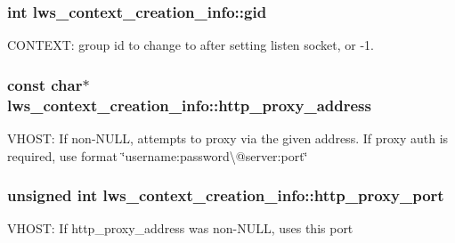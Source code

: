 \subsubsection[{\texorpdfstring{gid}{gid}}]{\setlength{\rightskip}{0pt plus 5cm}int lws\+\_\+context\+\_\+creation\+\_\+info\+::gid}\hypertarget{structlws__context__creation__info_a9c9d22437de92c197f3cee52912b2c03}{}\label{structlws__context__creation__info_a9c9d22437de92c197f3cee52912b2c03}
C\+O\+N\+T\+E\+XT\+: group id to change to after setting listen socket, or -\/1. 
\subsubsection[{\texorpdfstring{http\+\_\+proxy\+\_\+address}{http\_proxy\_address}}]{\setlength{\rightskip}{0pt plus 5cm}const char$\ast$ lws\+\_\+context\+\_\+creation\+\_\+info\+::http\+\_\+proxy\+\_\+address}\hypertarget{structlws__context__creation__info_aef917c0b23976a264d2474901b4f5aa3}{}\label{structlws__context__creation__info_aef917c0b23976a264d2474901b4f5aa3}
V\+H\+O\+ST\+: If non-\/\+N\+U\+LL, attempts to proxy via the given address. If proxy auth is required, use format \char`\"{}username\+:password\textbackslash{}@server\+:port\char`\"{} 
\subsubsection[{\texorpdfstring{http\+\_\+proxy\+\_\+port}{http\_proxy\_port}}]{\setlength{\rightskip}{0pt plus 5cm}unsigned int lws\+\_\+context\+\_\+creation\+\_\+info\+::http\+\_\+proxy\+\_\+port}\hypertarget{structlws__context__creation__info_a7b59f2bdc869871e7bde232db94f5ca6}{}\label{structlws__context__creation__info_a7b59f2bdc869871e7bde232db94f5ca6}
V\+H\+O\+ST\+: If http\+\_\+proxy\+\_\+address was non-\/\+N\+U\+LL, uses this port 
